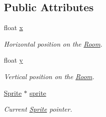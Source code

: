 \subsection*{Public Attributes}
\begin{DoxyCompactItemize}
\item 
float \hyperlink{class_object_a99addca3b5d96c214fa8f90474224699}{x}
\begin{DoxyCompactList}\small\item\em Horizontal position on the \hyperlink{class_room}{Room}. \end{DoxyCompactList}\item 
float \hyperlink{class_object_a2870044ec214e97550ee28db89c6382a}{y}
\begin{DoxyCompactList}\small\item\em Vertical position on the \hyperlink{class_room}{Room}. \end{DoxyCompactList}\item 
\hyperlink{class_sprite}{Sprite} $\ast$ \hyperlink{class_object_ad936466f3f6b6e8fa401842c573b44e6}{sprite}
\begin{DoxyCompactList}\small\item\em Current \hyperlink{class_sprite}{Sprite} pointer. \end{DoxyCompactList}\end{DoxyCompactItemize}
